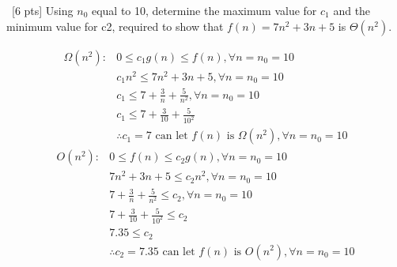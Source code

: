 \documentclass[12pt]{article}
\newenvironment{sol}[1][Solution]{\begin{trivlist}\item[\hskip\labelsep {\bfseries #1:}]}{\end{trivlist}}
\begin{document}
\begin{enumerate}
\begin{enumerate}
    \end{enumerate}
    \item \ [6 pts] Using $n_0$ equal to 10, determine the maximum value for $c_1$ and the minimum value for c2, required to show that $f(n) = 7n^2 + 3n + 5$ is $\Theta(n^2)$.
        \begin{sol}
        \begin{align*}
            \Omega(n^2): & 0 \leq c_1g(n) \leq f(n), \forall n = n_0 = 10\\
            & c_1 n^2 \leq 7n^2 + 3n + 5, \forall n = n_0 = 10\\
            & c_1 \leq 7 + \frac{3}{n} + \frac{5}{n^2}, \forall n = n_0 = 10\\
            & c_1 \leq 7 + \frac{3}{10} + \frac{5}{10^2}\\
            & \therefore c_1 = 7 \text{ can let }f(n) \text{ is } \Omega(n^2), \forall n = n_0 = 10
        \end{align*}
                \begin{align*}
            O(n^2): & 0 \leq  f(n)\leq c_2g(n), \forall n = n_0 = 10\\
            & 7n^2 + 3n + 5 \leq c_2 n^2, \forall n = n_0 = 10\\
            & 7 + \frac{3}{n} + \frac{5}{n^2} \leq  c_2 , \forall n = n_0 = 10\\
            & 7 + \frac{3}{10} + \frac{5}{10^2} \leq  c_2\\
            & 7.35 \leq c_2 \\
            & \therefore c_2 = 7.35 \text{ can let }f(n) \text{ is } O(n^2), \forall n = n_0 = 10 \\
        \end{align*}
    \end{sol}


\end{enumerate}
\end{document}

